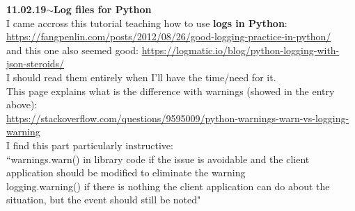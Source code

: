 \documentclass[11pt,a4paper]{article}
\newenvironment{loggentry}[2]%
{\noindent\textbf{#1}\hspace{1cm}$\mathbf{\sim}$\text{ }\textbf{#2}\\}{\vspace{0.5cm}}
\begin{document}
\begin{loggentry}{11.02.19}{Log files for Python}

I came accross this tutorial teaching how to use \textbf{logs in Python}:\\
\url{https://fangpenlin.com/posts/2012/08/26/good-logging-practice-in-python/}\\
and this one also seemed good:
\url{https://logmatic.io/blog/python-logging-with-json-steroids/}\\
I should read them entirely when I'll have the time/need for it.\\
This page explains what is the difference with warnings (showed in the entry above):\\
\url{https://stackoverflow.com/questions/9595009/python-warnings-warn-vs-logging-warning}\\
I find this part particularly instructive:\\
\indent ``warnings.warn() in library code if the issue is avoidable and the client application should be modified to eliminate the warning\\
\indent logging.warning() if there is nothing the client application can do about the situation, but the event should still be noted"\\

\end{loggentry}
\end{document}
